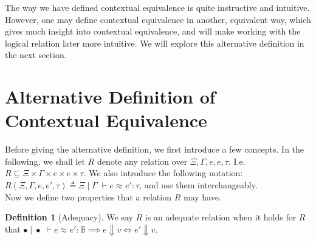 \documentclass[twoside,11pt,openright]{report}
\theoremstyle{definition}
\newtheorem{definition}{Definition}[section]
\newcommand{\expr}{e}
\newcommand{\val}{v}
\newcommand{\Tbool}{\mathbb{B}}
\newcommand{\typ}{\tau}
\newcommand{\venv}{\Gamma}
\newcommand{\tenv}{\Xi}
\newcommand{\emptenv}{\bullet}
\newcommand{\empvenv}{\bullet}
\newcommand{\jdgRel}[6]{#1 \; | \; #2 \; \vdash #3 \approx^{#4} #5 : #6}
\begin{document}
The way we have defined contextual equivalence is quite instructive and intuitive. However, one may define contextual equivalence in another, equivalent way, which gives much insight into contextual equivalence, and will make working with the logical relation later more intuitive. We will explore this alternative definition in the next section.

\section{Alternative Definition of Contextual Equivalence}
Before giving the alternative definition, we first introduce a few concepts. In the following, we shall let $R$ denote any relation over $\tenv, \venv, \expr, \expr, \typ$. I.e. $R \subseteq \tenv \times \venv \times \expr \times \expr \times \typ$. We also introduce the following notation: $R(\tenv, \venv, \expr, \expr', \typ) \triangleq \jdgRel{\tenv}{\venv}{\expr}{}{\expr'}{\typ}$, and use them interchangeably.\\
Now we define two properties that a relation $R$ may have.
\begin{definition}[Adequacy]
  We say $R$ is an adequate relation when it holds for $R$ that $\jdgRel{\emptenv}{\empvenv}{\expr}{}{\expr'}{\Tbool} \implies \expr \Downarrow \val \iff \expr' \Downarrow \val$.
\end{definition}
\end{document}
